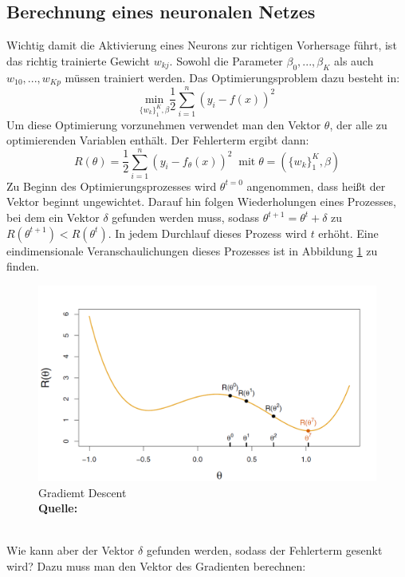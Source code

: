 \documentclass[a4paper,12pt]{thesis}
\newcommand*{\captionsource}[2]{%
	\caption[{#1}]{%
		#1%
		\\\hspace{\linewidth}%
		\textbf{Quelle:} #2%
	}%
}
\begin{document}
\subsection{Berechnung eines neuronalen Netzes}
Wichtig damit die Aktivierung eines Neurons zur richtigen Vorhersage führt, ist das richtig trainierte Gewicht $w_{kj}$. Sowohl die Parameter $\beta_0, ..., \beta_K$ als auch $w_{10}, ..., w_{Kp}$ müssen trainiert werden. Das Optimierungsproblem dazu besteht in:
\begin{equation}
	\label{NN:Optimization}
	\underset{ \{ w_k \}^K_1 , \beta }{\text{min}}\frac{1}{2}\sum_{i=1}^n (y_i-f(x))^2
\end{equation}
Um diese Optimierung vorzunehmen verwendet man den Vektor $\theta$, der alle zu optimierenden Variablen enthält. Der Fehlerterm ergibt dann:
\begin{equation}
	\label{NN:ErrorTerm}
	R(\theta)=\frac{1}{2}\sum_{i=1}^n (y_i-f_{\theta}(x))^2 \; \; \text{mit} \; \theta=(\{ w_k \}^K_1,\beta)
\end{equation}
Zu Beginn des Optimierungsprozesses wird $\theta^{t=0}$ angenommen, dass heißt der Vektor beginnt ungewichtet. Darauf hin folgen Wiederholungen eines Prozesses, bei dem ein Vektor $\delta$ gefunden werden muss, sodass $\theta^{t+1}=\theta^t + \delta$ zu $R(\theta^{t+1})<R(\theta^t)$. In jedem Durchlauf dieses Prozess wird $t$ erhöht. Eine eindimensionale Veranschaulichungen dieses Prozesses ist in Abbildung \ref{NN3} zu finden.
\begin{figure}[!ht]
	\centering
	\includegraphics[width=14cm]{Plots/NN3.png}
	\captionsource{Gradiemt Descent}{
		\cite{James2013DL}
	}
	\label{NN3}
\end{figure}\\
Wie kann aber der Vektor $\delta$ gefunden werden, sodass der Fehlerterm gesenkt wird? Dazu muss man den Vektor des Gradienten berechnen:
\end{document}

